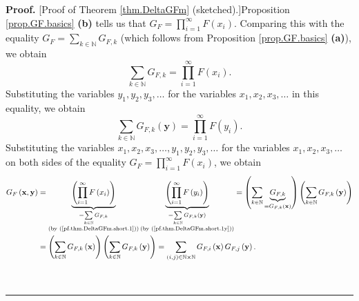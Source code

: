 \documentclass[numbers=enddot,12pt,final,onecolumn,notitlepage]{scrartcl}%
\theoremstyle{definition}
\newenvironment{proof}[1][Proof]{\noindent\textbf{#1.} }{\ \rule{0.5em}{0.5em}}
\let\sumnonlimits\sum
\let\prodnonlimits\prod
\renewcommand{\sum}{\sumnonlimits\limits}
\renewcommand{\prod}{\prodnonlimits\limits}
\newenvironment{vershort}{}{}
\begin{document}
\begin{vershort}
\begin{proof}
[Proof of Theorem \ref{thm.DeltaGFm} (sketched).]Proposition
\ref{prop.GF.basics} \textbf{(b)} tells us that $G_{F}=\prod_{i=1}^{\infty
}F\left(  x_{i}\right)  $. Comparing this with the equality $G_{F}=\sum
_{k\in\mathbb{N}}G_{F,k}$ (which follows from Proposition \ref{prop.GF.basics}
\textbf{(a)}), we obtain%
\begin{equation}
\sum_{k\in\mathbb{N}}G_{F,k}=\prod_{i=1}^{\infty}F\left(  x_{i}\right)  .
\label{pf.thm.DeltaGFm.short.1}%
\end{equation}
Substituting the variables $y_{1},y_{2},y_{3},\ldots$ for the variables
$x_{1},x_{2},x_{3},\ldots$ in this equality, we obtain
\begin{equation}
\sum_{k\in\mathbb{N}}G_{F,k}\left(  \mathbf{y}\right)  =\prod_{i=1}^{\infty
}F\left(  y_{i}\right)  . \label{pf.thm.DeltaGFm.short.1y}%
\end{equation}
Substituting the variables $x_{1},x_{2},x_{3},\ldots,y_{1},y_{2},y_{3},\ldots$
for the variables $x_{1},x_{2},x_{3},\ldots$ on both sides of the equality
$G_{F}=\prod_{i=1}^{\infty}F\left(  x_{i}\right)  $, we obtain%
\begin{align*}
G_{F}\left(  \mathbf{x},\mathbf{y}\right)   &  =\underbrace{\left(
\prod_{i=1}^{\infty}F\left(  x_{i}\right)  \right)  }_{\substack{=\sum
_{k\in\mathbb{N}}G_{F,k}\\\text{(by (\ref{pf.thm.DeltaGFm.short.1}))}%
}}\underbrace{\left(  \prod_{i=1}^{\infty}F\left(  y_{i}\right)  \right)
}_{\substack{=\sum_{k\in\mathbb{N}}G_{F,k}\left(  \mathbf{y}\right)
\\\text{(by (\ref{pf.thm.DeltaGFm.short.1y}))}}}=\left(  \sum_{k\in\mathbb{N}%
}\underbrace{G_{F,k}}_{=G_{F,k}\left(  \mathbf{x}\right)  }\right)  \left(
\sum_{k\in\mathbb{N}}G_{F,k}\left(  \mathbf{y}\right)  \right) \\
&  =\left(  \sum_{k\in\mathbb{N}}G_{F,k}\left(  \mathbf{x}\right)  \right)
\left(  \sum_{k\in\mathbb{N}}G_{F,k}\left(  \mathbf{y}\right)  \right)
=\sum_{\left(  i,j\right)  \in\mathbb{N}\times\mathbb{N}}G_{F,i}\left(
\mathbf{x}\right)  G_{F,j}\left(  \mathbf{y}\right)  .
\end{align*}



\end{proof}
\end{vershort}
\end{document}
